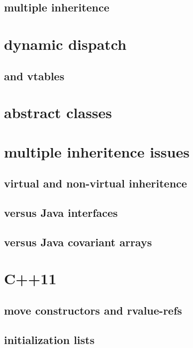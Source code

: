 \subsection{multiple inheritence}

\section{dynamic dispatch}

\subsection{and vtables}

\section{abstract classes}

\section{multiple inheritence issues}

\subsection{virtual and non-virtual inheritence}

\subsection{versus Java interfaces}

\subsection{versus Java covariant arrays}

\section{C++11}

\subsection{move constructors and rvalue-refs}

\subsection{initialization lists}

